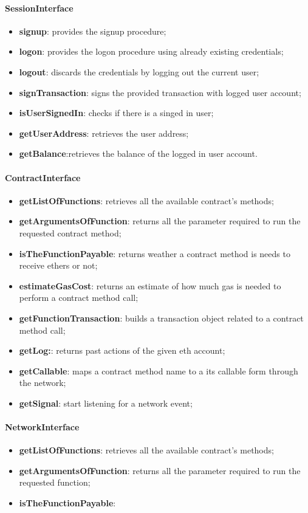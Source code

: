 \paragraph{SessionInterface}
\begin{itemize}
    \item \textbf{signup}: provides the signup procedure;
    \item \textbf{logon}: provides the logon procedure using already existing credentials;
    \item \textbf{logout}: discards the credentials by logging out the current user;
    \item \textbf{signTransaction}: signs the provided transaction with logged user account;
    \item \textbf{isUserSignedIn}: checks if there is a singed in user;
    \item \textbf{getUserAddress}: retrieves the user address;
    \item \textbf{getBalance}:retrieves the balance of the logged in user account.
\end{itemize}
\paragraph{ContractInterface}
\begin{itemize}
    \item \textbf{getListOfFunctions}: retrieves all the available contract's methods;
    \item \textbf{getArgumentsOfFunction}: returns all the parameter required to run the requested contract method;
    \item \textbf{isTheFunctionPayable}: returns weather a contract method is needs to receive ethers or not;
    \item \textbf{estimateGasCost}: returns an estimate of how much gas is needed to perform a contract method call;
    \item \textbf{getFunctionTransaction}: builds a transaction object related to a contract method call;
    \item \textbf{getLog:}: returns past actions of the given eth account; 
    \item \textbf{getCallable}: maps a contract method name to a its callable form through the network;
    \item \textbf{getSignal}: start listening for a network event;
\end{itemize}
\paragraph{NetworkInterface}
\begin{itemize}
    \item \textbf{getListOfFunctions}: retrieves all the available contract's methods;
    \item \textbf{getArgumentsOfFunction}: returns all the parameter required to run the requested function;
    \item \textbf{isTheFunctionPayable}: 
\end{itemize}
